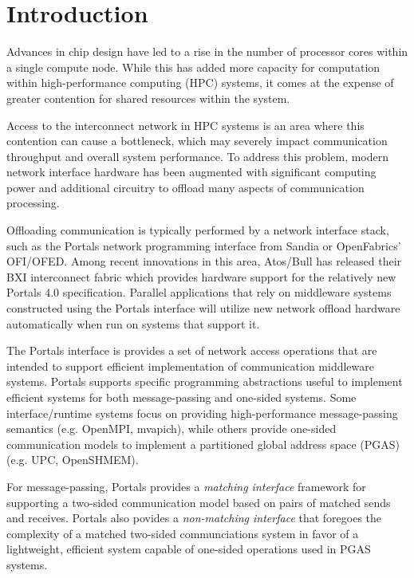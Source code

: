 \section{Introduction}

Advances in chip design have led to a rise in the number of processor
cores within a single compute node. While this has added more capacity
for computation within high-performance computing (HPC) systems, it
comes at the expense of greater contention for shared resources within
the system.

Access to the interconnect network in HPC systems is an area where
this contention can cause a bottleneck, which may severely impact
communication throughput and overall system performance. To address
this problem, modern network interface hardware has been augmented
with significant computing power and additional circuitry to offload
many aspects of communication processing.

Offloading communication is typically performed by a network interface
stack, such as the Portals network programming interface from Sandia
or OpenFabrics' OFI/OFED. Among recent innovations in this
area, Atos/Bull has released their BXI interconnect fabric which
provides hardware support for the relatively new Portals 4.0
specification. Parallel applications that rely on middleware systems
constructed using the Portals interface will utilize new network
offload hardware automatically when run on systems that support it.

The Portals interface is provides a set of network access operations
that are intended to support efficient implementation of communication
middleware systems. Portals supports specific programming abstractions
useful to implement efficient systems for both message-passing and
one-sided systems.  Some interface/runtime systems focus on providing
high-performance message-passing semantics (e.g. OpenMPI, mvapich),
while others provide one-sided communication models to implement a
partitioned global address space (PGAS) (e.g. UPC, OpenSHMEM).

For message-passing, Portals provides a {\em matching interface}
framework for supporting a two-sided communication model based on
pairs of matched sends and receives. Portals also povides a {\em
  non-matching interface} that foregoes the complexity of a matched
two-sided communciations system in favor of a lightweight, efficient
system capable of one-sided operations used in PGAS systems.

